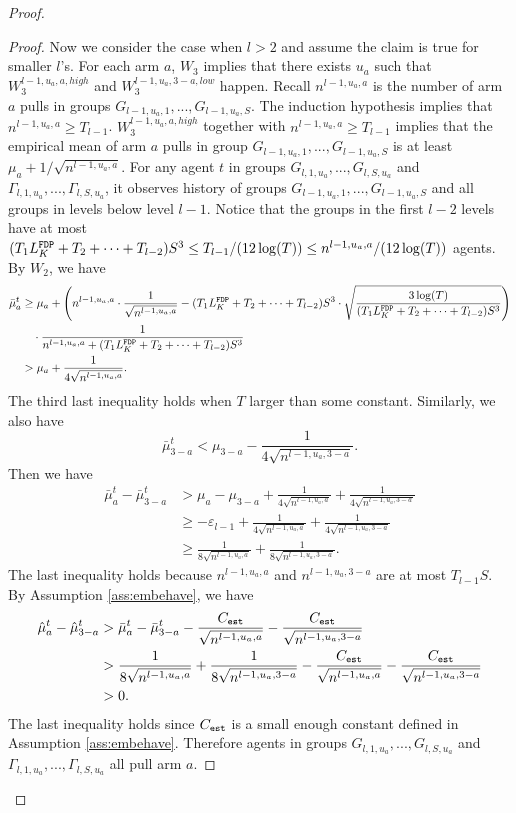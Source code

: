 \begin{proof}
\begin{proof}
Now we consider the case when $l > 2$ and assume the claim is true for smaller $l$'s. For each arm $a$, $W_3$ implies that there exists $u_a$ such that $W^{l-1,u_a,a,high}_3$ and $W^{l-1,u_a,3-a,low}_3$ happen. Recall $n^{l-1,u_a,a}$ is the number of arm $a$ pulls in groups $G_{l-1,u_a,1},...,G_{l-1,u_a,S}$. The induction hypothesis implies that $n^{l-1,u_a,a} \geq T_{l-1}$. $W^{l-1,u_a,a,high}_3$ together with $n^{l-1,u_a,a} \geq T_{l-1}$ implies that the empirical mean of arm $a$ pulls in group $G_{l-1,u_a,1},...,G_{l-1,u_a,S}$ is at least $\mu_a + 1/\sqrt{n^{l-1,u_a,a}}$. For any agent $t$ in groups $G_{l,1,u_a},...,G_{l,S,u_a}$ and $\Gamma_{l,1,u_a},...,\Gamma_{l,S,u_a}$, it observes history of groups $G_{l-1,u_a,1},...,G_{l-1,u_a,S}$ and all groups in levels below level $l-1$. Notice that the groups in the first $l-2$ levels have at most $(T_1 L^\mathtt{FDP}_K + T_2 + \cdots +T_{l-2})S^3 \leq T_{l-1}/(12\log(T)) \leq n^{l-1,u_a,a}/(12\log(T))$ agents. By $W_2$, we have
\begin{align*}
\bar{\mu}_a ^t &\geq \mu_a + \left(n^{l-1,u_a,a}  \cdot \frac{1}{\sqrt{n^{l-1,u_a,a} }}- (T_1 L^\mathtt{FDP}_K + T_2 + \cdots +T_{l-2})S^3\cdot \sqrt{\frac{3\log(T)}{ (T_1 L^\mathtt{FDP}_K + T_2 + \cdots +T_{l-2})S^3}} \right) \\
&~~~\cdot \frac{1}{n^{l-1,u_a,a}+ (T_1 L^\mathtt{FDP}_K + T_2 + \cdots +T_{l-2})S^3} \\
&> \mu_a + \frac{1}{4\sqrt{n^{l-1,u_a,a}  }}.
\end{align*}
The third last inequality holds when $T$ larger than some constant.
Similarly, we also have
\[
\bar{\mu}_{3-a}^t < \mu_{3-a}   -\frac{1}{4\sqrt{n^{l-1,u_a,3-a}  }}.
\]
Then we have
\begin{align*}
\bar{\mu}^t_a - \bar{\mu}^t_{3-a} &> \mu_a - \mu_{3-a}+ \frac{1}{4\sqrt{n^{l-1,u_a,a}  }} +\frac{1}{4\sqrt{n^{l-1,u_a,3-a}  }}\\
&\geq -\varepsilon_{l-1}+ \frac{1}{4\sqrt{n^{l-1,u_a,a}  }} +\frac{1}{4\sqrt{n^{l-1,u_a,3-a}  }}\\
&\geq \frac{1}{8\sqrt{n^{l-1,u_a,a}  }} +\frac{1}{8\sqrt{n^{l-1,u_a,3-a}  }}.
\end{align*}
The last inequality holds because $n^{l-1,u_a,a}$ and $n^{l-1,u_a,3-a}$ are at most $T_{l-1} S$. By Assumption \ref{ass:embehave}, we have
\begin{align*}
\hat{\mu}_a^t - \hat{\mu}_{3-a}^t &> \bar{\mu}^t_a - \bar{\mu}^t_{3-a} -  \frac{C_{\mathtt{est}}}{\sqrt{n^{l-1,u_a,a} }} - \frac{C_{\mathtt{est}}}{\sqrt{n^{l-1,u_a,3-a}}}\\
&> \frac{1}{8\sqrt{n^{l-1,u_a,a}  }} +\frac{1}{8\sqrt{n^{l-1,u_a,3-a}  }} -  \frac{C_{\mathtt{est}}}{\sqrt{n^{l-1,u_a,a} }} - \frac{C_{\mathtt{est}}}{\sqrt{n^{l-1,u_a,3-a}}}\\
&>0.
\end{align*}
The last inequality holds since $C_{\mathtt{est}}$ is a small enough constant defined in Assumption \ref{ass:embehave}.
Therefore agents in groups $G_{l,1,u_a},...,G_{l,S,u_a}$ and $\Gamma_{l,1,u_a},...,\Gamma_{l,S,u_a}$ all pull arm $a$.
\end{proof}


\end{proof}
